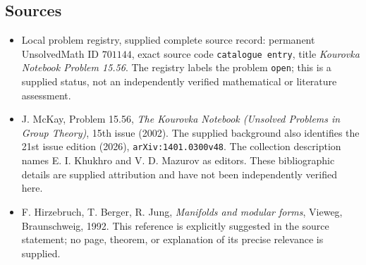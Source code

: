 \documentclass[11pt]{article}
\begin{document}
\subsection{Sources}
\begin{itemize}
\item Local problem registry, supplied complete source record: permanent UnsolvedMath ID \(701144\), exact source code \texttt{catalogue entry}, title \emph{Kourovka Notebook Problem 15.56}. The registry labels the problem \texttt{open}; this is a supplied status, not an independently verified mathematical or literature assessment.
\item J. McKay, Problem 15.56, \emph{The Kourovka Notebook (Unsolved Problems in Group Theory)}, 15th issue (2002). The supplied background also identifies the 21st issue edition (2026), \texttt{arXiv:1401.0300v48}. The collection description names E. I. Khukhro and V. D. Mazurov as editors. These bibliographic details are supplied attribution and have not been independently verified here.
\item F. Hirzebruch, T. Berger, R. Jung, \emph{Manifolds and modular forms}, Vieweg, Braunschweig, 1992. This reference is explicitly suggested in the source statement; no page, theorem, or explanation of its precise relevance is supplied.
\end{itemize}
\end{document}
